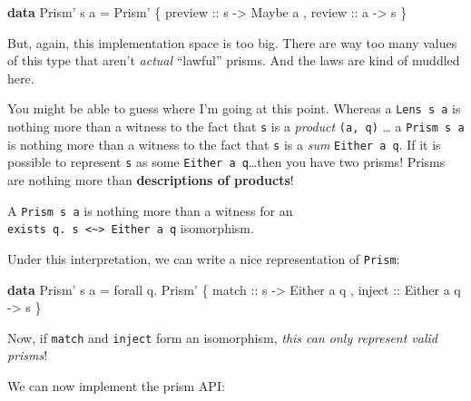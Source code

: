 \documentclass[]{article}
\newenvironment{Shaded}{}{}
\newcommand{\DataTypeTok}[1]{\textcolor[rgb]{0.56,0.13,0.00}{#1}}
\newcommand{\FunctionTok}[1]{\textcolor[rgb]{0.02,0.16,0.49}{#1}}
\newcommand{\KeywordTok}[1]{\textcolor[rgb]{0.00,0.44,0.13}{\textbf{#1}}}
\newcommand{\NormalTok}[1]{#1}
\newcommand{\OtherTok}[1]{\textcolor[rgb]{0.00,0.44,0.13}{#1}}
\begin{document}
\begin{Shaded}
\begin{Highlighting}[]
\KeywordTok{data} \DataTypeTok{Prism'}\NormalTok{ s a }\FunctionTok{=} \DataTypeTok{Prism'}\NormalTok{ \{}\OtherTok{ preview ::}\NormalTok{ s }\OtherTok{->} \DataTypeTok{Maybe}\NormalTok{ a}
\NormalTok{                         ,}\OtherTok{ review  ::}\NormalTok{ a }\OtherTok{->}\NormalTok{ s}
\NormalTok{                         \}}
\end{Highlighting}
\end{Shaded}

But, again, this implementation space is too big. There are way too many values
of this type that aren't \emph{actual} ``lawful'' prisms. And the laws are kind
of muddled here.

You might be able to guess where I'm going at this point. Whereas a
\texttt{Lens\textquotesingle{}\ s\ a} is nothing more than a witness to the fact
that \texttt{s} is a \emph{product} \texttt{(a,\ q)} \ldots{} a
\texttt{Prism\textquotesingle{}\ s\ a} is nothing more than a witness to the
fact that \texttt{s} is a \emph{sum} \texttt{Either\ a\ q}. If it is possible to
represent \texttt{s} as some \texttt{Either\ a\ q}\ldots{}then you have two
prisms! Prisms are nothing more than \textbf{descriptions of products}!

A \texttt{Prism\textquotesingle{}\ s\ a} is nothing more than a witness for an
\texttt{exists\ q.\ s\ \textless{}\textasciitilde{}\textgreater{}\ Either\ a\ q}
isomorphism.

Under this interpretation, we can write a nice representation of
\texttt{Prism\textquotesingle{}}:

\begin{Shaded}
\begin{Highlighting}[]
\KeywordTok{data} \DataTypeTok{Prism'}\NormalTok{ s a }\FunctionTok{=}\NormalTok{ forall q}\FunctionTok{.}
                  \DataTypeTok{Prism'}\NormalTok{ \{}\OtherTok{ match  ::}\NormalTok{ s }\OtherTok{->} \DataTypeTok{Either}\NormalTok{ a q}
\NormalTok{                         ,}\OtherTok{ inject ::} \DataTypeTok{Either}\NormalTok{ a q }\OtherTok{->}\NormalTok{ s}
\NormalTok{                         \}}
\end{Highlighting}
\end{Shaded}

Now, if \texttt{match} and \texttt{inject} form an isomorphism, \emph{this can
only represent valid prisms}!

We can now implement the prism API:
\end{document}
